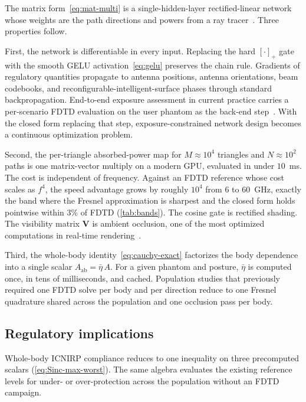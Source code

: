 \documentclass[journal,twocolumn,10pt]{IEEEtran}
\theoremstyle{plain}
\theoremstyle{remark}
\newcommand{\Aab}{A_{\mathrm{ab}}}
\begin{document}
The matrix form~\eqref{eq:mat-multi} is a single-hidden-layer
rectified-linear network whose weights are the path directions and
powers from a ray tracer~\cite{SionnaRT}. Three properties follow.

First, the network is differentiable in every input. Replacing the
hard $[\cdot]_+$ gate with the smooth \gls{GELU}
activation~\eqref{eq:gelu} preserves the chain rule. Gradients of
regulatory quantities propagate to antenna positions, antenna
orientations, beam codebooks, and reconfigurable-intelligent-surface
phases through standard backpropagation. End-to-end exposure
assessment in current practice carries a per-scenario FDTD
evaluation on the user phantom as the back-end
step~\cite{Wydaeghe2022access,Wydaeghe2026npj}. With the closed form
replacing that step, exposure-constrained network design becomes a
continuous optimization problem.

Second, the per-triangle absorbed-power map for $M \approx 10^4$
triangles and $N \approx 10^2$ paths is one matrix-vector multiply on
a modern GPU, evaluated in under $10$~ms. The cost is independent of
frequency. Against an FDTD reference whose cost scales as $f^4$, the
speed advantage grows by roughly $10^4$ from $6$ to $60$~GHz, exactly
the band where the Fresnel approximation is sharpest and the closed
form holds pointwise within $3\%$ of FDTD (\cref{tab:bands}). The
cosine gate is rectified shading. The visibility matrix $\mathbf{V}$
is ambient occlusion, one of the most optimized computations in
real-time rendering~\cite{AkenineMoller2018}.

Third, the whole-body identity~\eqref{eq:cauchy-exact} factorizes the
body dependence into a single scalar $\Aab = \bar\eta\,A$. For a
given phantom and posture, $\bar\eta$ is computed once, in tens of
milliseconds, and cached. Population studies that previously
required one FDTD solve per body and per direction reduce to one
Fresnel quadrature shared across the population and one occlusion
pass per body.

\subsection{Regulatory implications}\label{subsec:disc-regulatory}

Whole-body ICNIRP compliance reduces to one inequality on three
precomputed scalars (\cref{eq:Sinc-max-worst}). The same algebra
evaluates the existing reference levels for under- or over-protection
across the population without an FDTD campaign.
\end{document}
